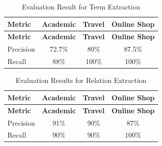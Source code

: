 \hypertarget{tbl:eval.term-extraction}{}
\begin{longtable}{@{}lccc@{}}
\caption{\label{tbl:eval.term-extraction}Evaluation Result for Term Extraction}\tabularnewline
\toprule
\begin{minipage}[b]{0.30\columnwidth}\raggedright
\textbf{Metric}\strut
\end{minipage} & 
\begin{minipage}[b]{0.23\columnwidth}\centering
\textbf{Academic}\strut
\end{minipage} & 
\begin{minipage}[b]{0.23\columnwidth}\centering
\textbf{Travel}\strut
\end{minipage} & 
\begin{minipage}[b]{0.24\columnwidth}\centering
\textbf{Online Shop}\strut
\end{minipage} \tabularnewline
\midrule
\endfirsthead

\toprule
\textbf{Metric} & \textbf{Academic} & \textbf{Travel} & \textbf{Online Shop} \tabularnewline
\midrule
\endhead

Precision & 72.7\% & 80\% & 87.5\% \tabularnewline
Recall & 88\% & 100\% & 100\% \tabularnewline

\bottomrule
\end{longtable}

\hypertarget{tbl:eval.relation-extraction}{}
\begin{longtable}{@{}lccc@{}}
\caption{\label{tbl:eval.relation-extraction}Evaluation Results for Relation Extraction}\tabularnewline
\toprule
\begin{minipage}[b]{0.30\columnwidth}\raggedright
\textbf{Metric}\strut
\end{minipage} & 
\begin{minipage}[b]{0.20\columnwidth}\centering
\textbf{Academic}\strut
\end{minipage} & 
\begin{minipage}[b]{0.20\columnwidth}\centering
\textbf{Travel}\strut
\end{minipage} & 
\begin{minipage}[b]{0.20\columnwidth}\centering
\textbf{Online Shop}\strut
\end{minipage} \tabularnewline
\midrule
\endfirsthead

\toprule
\begin{minipage}[b]{0.30\columnwidth}\raggedright
\textbf{Metric}\strut
\end{minipage} & 
\begin{minipage}[b]{0.20\columnwidth}\centering
\textbf{Academic}\strut
\end{minipage} & 
\begin{minipage}[b]{0.20\columnwidth}\centering
\textbf{Travel}\strut
\end{minipage} & 
\begin{minipage}[b]{0.20\columnwidth}\centering
\textbf{Online Shop}\strut
\end{minipage} \tabularnewline
\midrule
\endhead

Precision & 91\% & 90\% & 87\% \tabularnewline
Recall & 90\% & 90\% & 100\% \tabularnewline

\bottomrule
\end{longtable}

